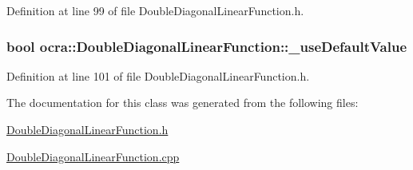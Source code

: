Definition at line 99 of file Double\+Diagonal\+Linear\+Function.\+h.

\subsubsection[{\texorpdfstring{\+\_\+use\+Default\+Value}{_useDefaultValue}}]{\setlength{\rightskip}{0pt plus 5cm}bool ocra\+::\+Double\+Diagonal\+Linear\+Function\+::\+\_\+use\+Default\+Value\hspace{0.3cm}{\ttfamily [protected]}}\hypertarget{classocra_1_1DoubleDiagonalLinearFunction_afbb8120fd4b8bda14ee829c78b6cc817}{}\label{classocra_1_1DoubleDiagonalLinearFunction_afbb8120fd4b8bda14ee829c78b6cc817}


Definition at line 101 of file Double\+Diagonal\+Linear\+Function.\+h.



The documentation for this class was generated from the following files\+:\begin{DoxyCompactItemize}
\item 
\hyperlink{DoubleDiagonalLinearFunction_8h}{Double\+Diagonal\+Linear\+Function.\+h}\item 
\hyperlink{DoubleDiagonalLinearFunction_8cpp}{Double\+Diagonal\+Linear\+Function.\+cpp}\end{DoxyCompactItemize}
